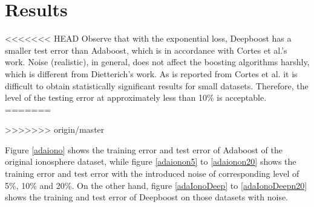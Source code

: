 \section{Results}
<<<<<<< HEAD
Observe that with the exponential loss, Deepboost has a smaller test error than Adaboost, which is in accordance with Cortes et al.’s work\cite{cortes2014deep}.
Noise (realistic), in general, does not affect the boosting algorithms harshly, which is different from Dietterich’s work\cite{dietterich2000experimental}.
As is reported from Cortes et al. it is difficult to obtain statistically significant results for small datasets.
Therefore, the level of the testing error at approximately less than 10\% is acceptable.
=======

%
%
%



>>>>>>> origin/master

Figure \ref{adaiono} shows the training error and test error of Adaboost of the original ionosphere dataset,
while figure \ref{adaionon5} to \ref{adaionon20} shows the training error and test error with the introduced noise of
corresponding level of 5\%, 10\% and 20\%. On the other hand, figure \ref{adaIonoDeep} to \ref{adaIonoDeepn20} shows the training
and test error of Deepboost on those datasets with noise.









